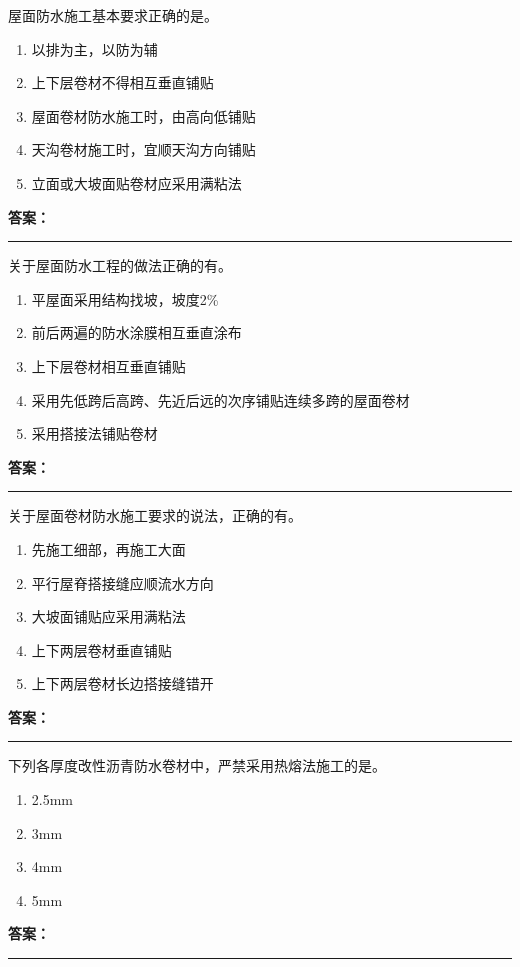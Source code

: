 \documentclass[UTF8,fontset=fandol,11pt]{ctexart}
\newcommand{\answerline}{\textcolor{answerred}{\rule{2.4cm}{0.7pt}}}
\begin{document}
\begin{quizbox}[title={第 2 题}]
屋面防水施工基本要求正确的是。\\
\begin{enumerate}[label=\Alph*.]
\item 以排为主，以防为辅
\item 上下层卷材不得相互垂直铺贴
\item 屋面卷材防水施工时，由高向低铺贴
\item 天沟卷材施工时，宜顺天沟方向铺贴
\item 立面或大坡面贴卷材应采用满粘法
\end{enumerate}
\textbf{\textcolor{answerred}{答案：}} \answerline
\end{quizbox}

\begin{quizbox}[title={第 3 题}]
关于屋面防水工程的做法正确的有。\\
\begin{enumerate}[label=\Alph*.]
\item 平屋面采用结构找坡，坡度2\%
\item 前后两遍的防水涂膜相互垂直涂布
\item 上下层卷材相互垂直铺贴
\item 采用先低跨后高跨、先近后远的次序铺贴连续多跨的屋面卷材
\item 采用搭接法铺贴卷材
\end{enumerate}
\textbf{\textcolor{answerred}{答案：}} \answerline
\end{quizbox}

\begin{quizbox}[title={第 4 题}]
关于屋面卷材防水施工要求的说法，正确的有。\\
\begin{enumerate}[label=\Alph*.]
\item 先施工细部，再施工大面
\item 平行屋脊搭接缝应顺流水方向
\item 大坡面铺贴应采用满粘法
\item 上下两层卷材垂直铺贴
\item 上下两层卷材长边搭接缝错开
\end{enumerate}
\textbf{\textcolor{answerred}{答案：}} \answerline
\end{quizbox}

\begin{quizbox}[title={第 5 题}]
下列各厚度改性沥青防水卷材中，严禁采用热熔法施工的是。\\
\begin{enumerate}[label=\Alph*.]
\item 2.5mm
\item 3mm
\item 4mm
\item 5mm
\end{enumerate}
\textbf{\textcolor{answerred}{答案：}} \answerline
\end{quizbox}
\end{document}
